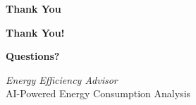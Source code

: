 \documentclass[11pt,aspectratio=169,notes,mathserif]{beamer}
\begin{document}
\begin{frame}{\textbf{Thank You}}
    \begin{center}
        \Large
        \textbf{Thank You!}
        
        \vspace{1cm}
        \Large
        \textbf{Questions?}
        
        \vspace{2cm}
        \normalsize
        \textit{Energy Efficiency Advisor} \\
        \small AI-Powered Energy Consumption Analysis
        
    \end{center}
\end{frame}
\end{document}
